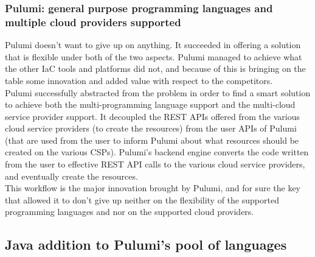 \subsubsection{Pulumi: general purpose programming languages and multiple cloud providers supported}
Pulumi doesn't want to give up on anything.
It succeeded in offering a solution that is flexible under both of the two aspects.
Pulumi managed to achieve what the other IaC tools and platforms did not, and because of this is bringing on the table some innovation and added value with respect to the competitors.\\
Pulumi successfully abstracted from the problem in order to find a smart solution to achieve both the multi-programming language support and the multi-cloud service provider support.
It decoupled the REST APIs offered from the various cloud service providers (to create the resources) from the user APIs of Pulumi (that are used from the user to inform Pulumi about what resources should be created on the various CSPs).
Pulumi's backend engine converts the code written from the user to effective REST API calls to the various cloud service providers, and eventually create the resources.\\
This workflow is the major innovation brought by Pulumi, and for sure the key that allowed it to don't give up neither on the flexibility of the supported programming languages and nor on the supported cloud providers.

\subsection{Java addition to Pulumi's pool of languages}

